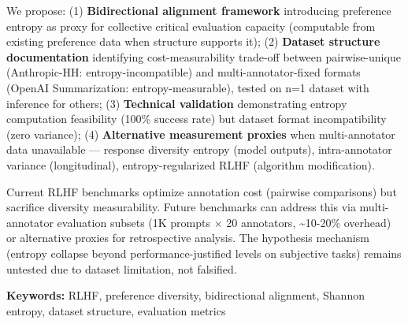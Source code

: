 We propose: (1) \textbf{Bidirectional alignment framework} introducing preference entropy as proxy for collective critical evaluation capacity (computable from existing preference data when structure supports it); (2) \textbf{Dataset structure documentation} identifying cost-measurability trade-off between pairwise-unique (Anthropic-HH: entropy-incompatible) and multi-annotator-fixed formats (OpenAI Summarization: entropy-measurable), tested on n=1 dataset with inference for others; (3) \textbf{Technical validation} demonstrating entropy computation feasibility (100\% success rate) but dataset format incompatibility (zero variance); (4) \textbf{Alternative measurement proxies} when multi-annotator data unavailable — response diversity entropy (model outputs), intra-annotator variance (longitudinal), entropy-regularized RLHF (algorithm modification).

Current RLHF benchmarks optimize annotation cost (pairwise comparisons) but sacrifice diversity measurability. Future benchmarks can address this via multi-annotator evaluation subsets (1K prompts $\times$ 20 annotators, \textasciitilde{}10-20\% overhead) or alternative proxies for retrospective analysis. The hypothesis mechanism (entropy collapse beyond performance-justified levels on subjective tasks) remains untested due to dataset limitation, not falsified.

\textbf{Keywords:} RLHF, preference diversity, bidirectional alignment, Shannon entropy, dataset structure, evaluation metrics
